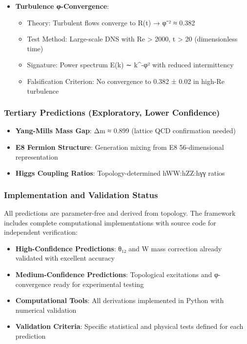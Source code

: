 \documentclass[12pt,a4paper]{article}
\begin{document}
\begin{itemize}
\begin{itemize}
\begin{itemize}
\item \textbf{Turbulence φ-Convergence}:
  \begin{itemize}
  \item Theory: Turbulent flows converge to R(t) → φ⁻² ≈ 0.382
  \item Test Method: Large-scale DNS with Re > 2000, t > 20 (dimensionless time)
  \item Signature: Power spectrum E(k) ∼ k^{-φ²} with reduced intermittency
  \item Falsification Criterion: No convergence to 0.382 ± 0.02 in high-Re turbulence
  \end{itemize}
\end{itemize}

\subsubsection{Tertiary Predictions (Exploratory, Lower Confidence)}
\begin{itemize}
\item \textbf{Yang-Mills Mass Gap}: Δm ≈ 0.899 (lattice QCD confirmation needed)
\item \textbf{E8 Fermion Structure}: Generation mixing from E8 56-dimensional representation
\item \textbf{Higgs Coupling Ratios}: Topology-determined hWW:hZZ:hγγ ratios
\end{itemize}

\subsubsection{Implementation and Validation Status}

All predictions are parameter-free and derived from topology. The framework includes complete computational implementations with source code for independent verification:

\begin{itemize}
\item \textbf{High-Confidence Predictions}: θ₁₂ and W mass correction already validated with excellent accuracy
\item \textbf{Medium-Confidence Predictions}: Topological excitations and φ-convergence ready for experimental testing
\item \textbf{Computational Tools}: All derivations implemented in Python with numerical validation
\item \textbf{Validation Criteria}: Specific statistical and physical tests defined for each prediction
\end{itemize}


\end{itemize}
\end{itemize}
\end{document}
